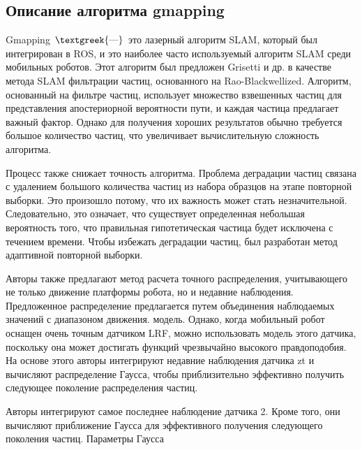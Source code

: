 \documentclass[a4paper]{article}
\begin{document}
\clearpage\subsection[Описание алгоритма gmapping]{Описание алгоритма \foreignlanguage{english}{gmapping}}
Gmapping $\text{\textgreek{—}}$ это лазерный алгоритм SLAM, который был интегрирован в ROS, и это наиболее часто
используемый алгоритм SLAM среди мобильных роботов. Этот алгоритм был предложен Grisetti и др. в качестве метода SLAM
фильтрации частиц, основанного на Rao-Blackwellized. Алгоритм, основанный на фильтре частиц, использует множество
взвешенных частиц для представления апостериорной вероятности пути, и каждая частица предлагает важный фактор. Однако
для получения хороших результатов обычно требуется большое количество частиц, что увеличивает вычислительную сложность
алгоритма.

Процесс также снижает точность алгоритма. Проблема деградации частиц связана с удалением большого количества частиц из
набора образцов на этапе повторной выборки. Это произошло потому, что их важность может стать незначительной.
Следовательно, это означает, что существует определенная небольшая вероятность того, что правильная гипотетическая
частица будет исключена с течением времени. Чтобы избежать деградации частиц, был разработан метод адаптивной повторной
выборки.

Авторы также предлагают метод расчета точного распределения, учитывающего не только движение платформы робота, но и
недавние наблюдения. Предложенное распределение предлагается путем объединения наблюдаемых значений с диапазоном
движения. модель. Однако, когда мобильный робот оснащен очень точным датчиком LRF, можно использовать модель этого
датчика, поскольку она может достигать функций чрезвычайно высокого правдоподобия. На основе этого авторы интегрируют
недавние наблюдения датчика zt и вычисляют распределение Гаусса, чтобы приблизительно эффективно получить следующее
поколение распределения частиц.

Авторы интегрируют самое последнее наблюдение датчика 2. Кроме того, они вычисляют приближение Гаусса для эффективного
получения следующего поколения частиц. Параметры Гаусса


\end{document}
